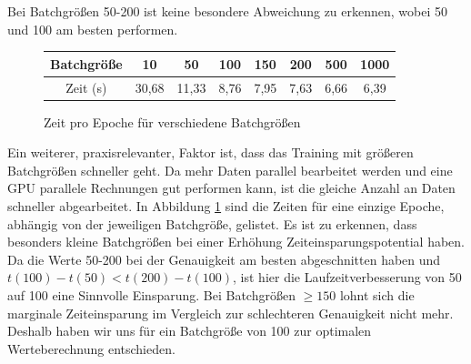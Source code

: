 Bei Batchgrößen 50-200 ist keine besondere Abweichung zu erkennen, wobei 50 und 100 am besten performen.
\begin{figure}[H]
	\centering
	\begin{tabular}{|c|c|c|c|c|c|c|c|}\hline
		Batchgröße&10&50&100&150&200&500&1000\\\hline
		Zeit (s)&30,68&11,33&8,76&7,95&7,63&6,66&6,39\\\hline
	\end{tabular}
	\caption{Zeit pro Epoche für verschiedene Batchgrößen }
	\label{fig:batchsize_time}
\end{figure}
Ein weiterer, praxisrelevanter, Faktor ist, dass das Training mit größeren Batchgrößen schneller geht. Da mehr Daten parallel bearbeitet werden und eine GPU parallele Rechnungen gut performen kann, ist die gleiche Anzahl an Daten schneller abgearbeitet. In Abbildung \ref{fig:batchsize_time} sind die Zeiten für eine einzige Epoche, abhängig von der jeweiligen Batchgröße, gelistet. Es ist zu erkennen, dass besonders kleine Batchgrößen bei einer Erhöhung Zeiteinsparungspotential haben. Da die Werte 50-200 bei der Genauigkeit am besten abgeschnitten haben und $t(100)-t(50) <t(200)-t(100)$, ist hier die Laufzeitverbesserung von 50 auf 100 eine Sinnvolle Einsparung. Bei Batchgrößen $\geq 150$ lohnt sich die marginale Zeiteinsparung im Vergleich zur schlechteren Genauigkeit nicht mehr.\\
Deshalb haben wir uns für ein Batchgröße von 100 zur optimalen Werteberechnung entschieden.


